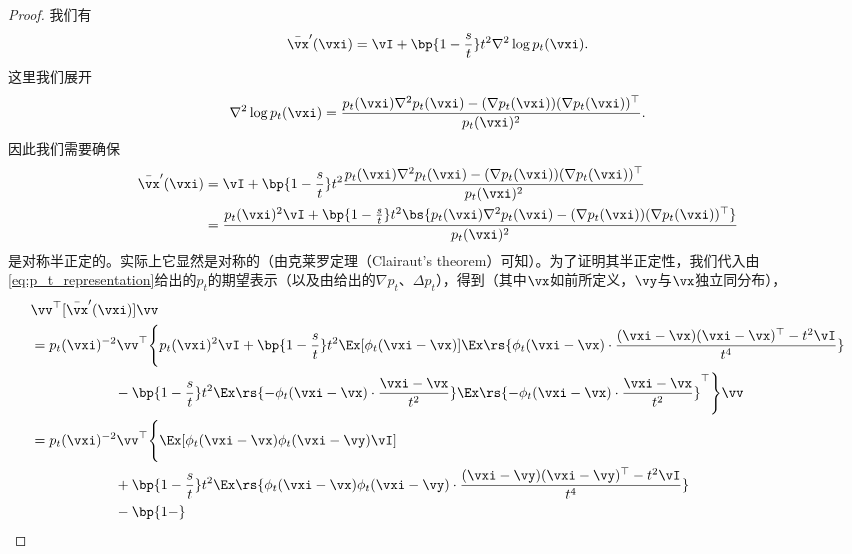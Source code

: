 \documentclass[../../book-main_zh.tex]{subfiles}
\begin{document}
\begin{proof}
    我们有
    \begin{equation}
        \bar{\vx}^{\prime}(\vxi) = \vI + \bp{1 -
        \frac{s}{t}}t^{2}\nabla^{2}\log p_{t}(\vxi).
    \end{equation}
    这里我们展开
    \begin{equation}
        \nabla^{2}\log p_{t}(\vxi) =
        \frac{p_{t}(\vxi)\nabla^{2}p_{t}(\vxi) - (\nabla
        p_{t}(\vxi))(\nabla p_{t}(\vxi))^{\top}}{p_{t}(\vxi)^{2}}.
    \end{equation}
    因此我们需要确保
    \begin{align}
        \bar{\vx}^{\prime}(\vxi)
        &= \vI + \bp{1 -
        \frac{s}{t}}t^{2}\frac{p_{t}(\vxi)\nabla^{2}p_{t}(\vxi) -
        (\nabla p_{t}(\vxi))(\nabla p_{t}(\vxi))^{\top}}{p_{t}(\vxi)^{2}} \\
        &= \frac{p_{t}(\vxi)^{2}\vI + \bp{1 -
            \frac{s}{t}}t^{2}\bs{p_{t}(\vxi)\nabla^{2}p_{t}(\vxi) -
        (\nabla p_{t}(\vxi))(\nabla p_{t}(\vxi))^{\top}}}{p_{t}(\vxi)^{2}}
    \end{align}
    是对称半正定的。实际上它显然是对称的（由克莱罗定理（Clairaut's theorem）可知）。为了证明其半正定性，我们代入由\eqref{eq:p_t_representation}给出的\(p_{t}\)的期望表示（以及由给出的\(\nabla p_{t}\)、\(\Delta p_{t}\)），得到（其中\(\vx\)如前所定义，\(\vy\)与\(\vx\)独立同分布），
    \begin{align}
        &\vv^{\top}[\bar{\vx}^{\prime}(\vxi)]\vv \\
        &= p_{t}(\vxi)^{-2}\vv^{\top}\Bigg\{p_{t}(\vxi)^{2}\vI +
            \bp{1 - \frac{s}{t}}t^{2}\Ex[\phi_{t}(\vxi -
            \vx)]\Ex\rs{\phi_{t}(\vxi - \vx)\cdot\frac{(\vxi -
            \vx)(\vxi - \vx)^{\top} - t^{2}\vI}{t^{4}}} \\
            & \qquad \qquad \qquad -\bp{1 -
            \frac{s}{t}}t^{2}\Ex\rs{-\phi_{t}(\vxi - \vx)\cdot\frac{\vxi
            - \vx}{t^{2}}}\Ex\rs{-\phi_{t}(\vxi - \vx)\cdot\frac{\vxi -
        \vx}{t^{2}}}^{\top}\Bigg\}\vv \\
        &= p_{t}(\vxi)^{-2}\vv^{\top}\Bigg\{\Ex[\phi_{t}(\vxi -
            \vx)\phi_{t}(\vxi - \vy)\vI] \\
            & \qquad \qquad \qquad + \bp{1 -
            \frac{s}{t}}t^{2}\Ex\rs{\phi_{t}(\vxi - \vx)\phi_{t}(\vxi
                - \vy)\cdot\frac{(\vxi - \vy)(\vxi - \vy)^{\top} -
            t^{2}\vI}{t^{4}}} \\
            & \qquad \qquad \qquad -\bp{1 -
}
\end{align}
\end{proof}
\end{document}

